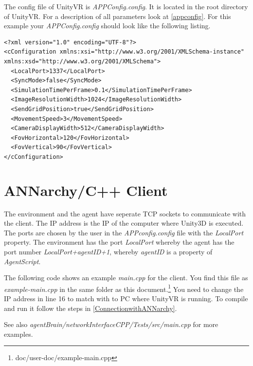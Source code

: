 \documentclass[10pt,final]{scrreprt}
\begin{document}
The config file of UnityVR is \emph{APPConfig.config}. It is located in the root directory of UnityVR.  For a description of all parameters look at \ref{appconfig}. For this example your \emph{APPConfig.config} should look like the following listing.



\begin{lstlisting}
<?xml version="1.0" encoding="UTF-8"?>
<cConfiguration xmlns:xsi="http://www.w3.org/2001/XMLSchema-instance" xmlns:xsd="http://www.w3.org/2001/XMLSchema">
  <LocalPort>1337</LocalPort>
  <SyncMode>false</SyncMode>
  <SimulationTimePerFrame>0.1</SimulationTimePerFrame>
  <ImageResolutionWidth>1024</ImageResolutionWidth>
  <SendGridPosition>true</SendGridPosition>
  <MovementSpeed>3</MovementSpeed>
  <CameraDisplayWidth>512</CameraDisplayWidth>
  <FovHorizontal>120</FovHorizontal>
  <FovVertical>90</FovVertical>
</cConfiguration>
\end{lstlisting}


\section{ANNarchy/C++ Client}


The environment and the agent have seperate TCP sockets to communicate with the client. The IP address  is the IP of the computer where Unity3D is executed. The ports are chosen by the user in the \emph{APPconfig.config} file with the \emph{LocalPort} property. The environment has the port \emph{LocalPort} whereby the agent has the port number \emph{LocalPort+agentID+1}, whereby \emph{agentID} is a property of \emph{AgentScript}.

The following code shows an example \emph{main.cpp} for the client. You find this file as \emph{example-main.cpp} in the same folder as this document.\footnote{doc/user-doc/example-main.cpp} You need to change the IP address in line 16 to match with to PC where UnityVR is running. To compile and run it follow the steps in \ref{ConnectionwithANNarchy}.




See also \emph{agentBrain/networkInterfaceCPP/Tests/src/main.cpp} for more examples.
\end{document}
